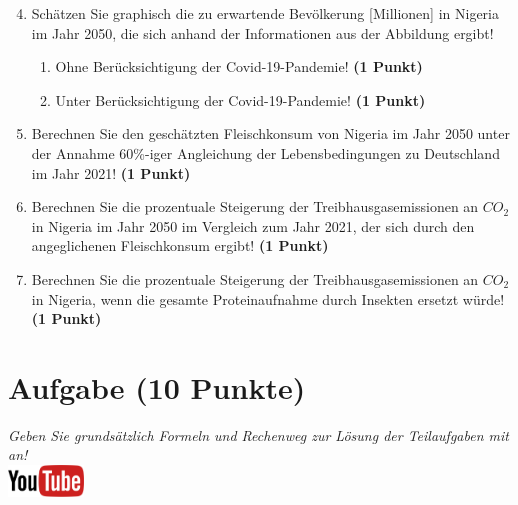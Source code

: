 \documentclass[a4paper, 9pt]{scrartcl}\usepackage[]{graphicx}\usepackage[]{xcolor}
\begin{document}
\begin{enumerate}
  \setcounter{enumi}{3}  
\item Sch{\"a}tzen Sie graphisch die zu erwartende Bev{\"o}lkerung [Millionen] in Nigeria im
  Jahr 2050, die sich anhand der Informationen aus der Abbildung ergibt!
\begin{enumerate}
\item Ohne Ber{\"u}cksichtigung der Covid-19-Pandemie! \textbf{(1
    Punkt)}
\item Unter Ber{\"u}cksichtigung der Covid-19-Pandemie! \textbf{(1
    Punkt)}
\end{enumerate}
\item Berechnen Sie den gesch{\"a}tzten Fleischkonsum von Nigeria im Jahr
  2050 unter der Annahme 60\%-iger Angleichung der Lebensbedingungen zu
  Deutschland im Jahr 2021! \textbf{(1 Punkt)}
\item Berechnen Sie die prozentuale Steigerung der Treibhausgasemissionen
  an $CO_2$ in Nigeria im Jahr 2050 im Vergleich zum Jahr 2021, der
  sich durch den angeglichenen Fleischkonsum ergibt! \textbf{(1 Punkt)}
\item Berechnen Sie die prozentuale Steigerung der Treibhausgasemissionen
  an $CO_2$ in Nigeria, wenn die gesamte Proteinaufnahme 
  durch Insekten ersetzt w{\"u}rde! \textbf{(1
    Punkt)}
\end{enumerate}







 
\clearpage

\section{Aufgabe \hfill (10 Punkte)}

\textit{Geben Sie grunds{\"a}tzlich Formeln und Rechenweg zur L{\"o}sung der
  Teilaufgaben mit an!} \\[1Ex]

\hfill\href{https://youtu.be/8Pb2sKUIMyk}{\includegraphics[width =
  2cm]{img/youtube}} %
\hspace{2Ex}
\end{document}

